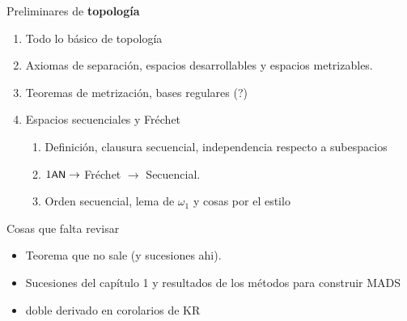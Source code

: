         \begin{flushright}
            Preliminares de \textbf{topología}
        \end{flushright}
        \begin{enumerate}
            \item Todo lo básico de topología
            
            \item Axiomas de separación, espacios desarrollables y espacios metrizables.
            
            \item Teoremas de metrización, bases regulares (?)
            
            \item Espacios secuenciales y Fréchet
            \begin{enumerate}
                \item Definición, clausura secuencial, independencia respecto a subespacios
                \item $1 \text{\textsf{\small AN}} \to $ Fréchet $\to$ Secuencial.
                \item Orden secuencial, lema de $\omega_1$ y cosas por el estilo
            \end{enumerate}
        \end{enumerate}
        
    \begin{flushright}
        Cosas que falta revisar
    \end{flushright}
        \begin{itemize}
            \item Teorema que no sale (y sucesiones ahi).
            \item Sucesiones del capítulo 1 y resultados de los métodos para construir MADS
            \item doble derivado en corolarios de KR
    \end{itemize}

